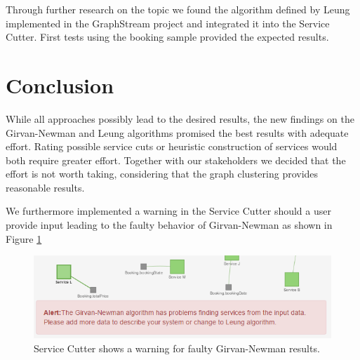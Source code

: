 Through further research on the topic we found the algorithm defined by Leung implemented in the GraphStream\cite{leungGraphstream} project and integrated it into the Service Cutter. First tests using the booking sample provided the expected results.

\section{Conclusion}

While all approaches possibly lead to the desired results, the new findings on the Girvan-Newman and Leung algorithms promised the best results with adequate effort. Rating possible service cuts or heuristic construction of services would both require greater effort. Together with our stakeholders we decided that the effort is not worth taking, considering that the graph clustering provides reasonable results. 

We furthermore implemented a warning in the Service Cutter should a user provide input leading to the faulty behavior of Girvan-Newman as shown in Figure \ref{fig:girvanNewmanWarning}

\begin{figure}[H]
	\begin{center}
		\includegraphics[scale=0.9]{images/grivanNewmanAlert.png}
	\end{center}
	\caption{Service Cutter shows a warning for faulty Girvan-Newman results.}
	\label{fig:girvanNewmanWarning}
\end{figure}
	